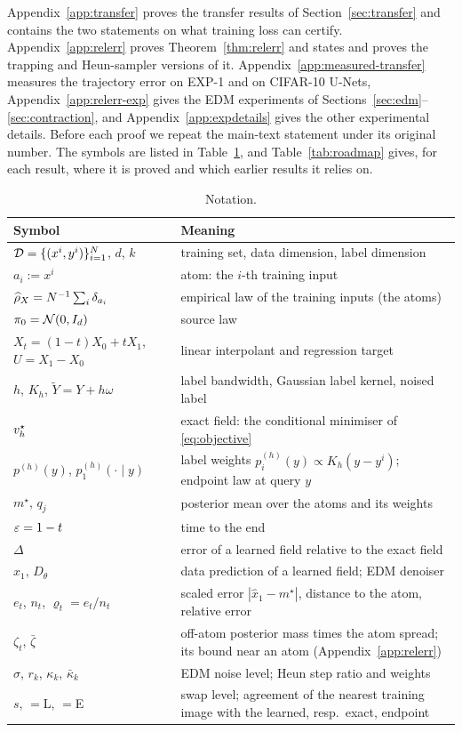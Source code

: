\documentclass{article} %
\theoremstyle{plain}
\theoremstyle{definition}
\theoremstyle{remark}
\begin{document}
Appendix~\ref{app:transfer} proves the transfer results of Section~\ref{sec:transfer} and contains
the two statements on what training loss can certify. Appendix~\ref{app:relerr} proves
Theorem~\ref{thm:relerr} and states and proves the trapping and Heun-sampler versions of it.
Appendix~\ref{app:measured-transfer} measures the trajectory error on EXP-1 and on CIFAR-10
U-Nets, Appendix~\ref{app:relerr-exp} gives the EDM experiments of
Sections~\ref{sec:edm}--\ref{sec:contraction}, and Appendix~\ref{app:expdetails} gives the other
experimental details. Before each proof we repeat the main-text statement under its original
number. The symbols are listed in Table~\ref{tab:notation}, and Table~\ref{tab:roadmap} gives, for each
result, where it is proved and which earlier results it relies on.

\begin{table}[h]
\centering\small
\begin{tabular}{@{}p{}p{}@{}}
\toprule
Symbol & Meaning\\
\midrule
$\mathcal{D}=\{(x^i,y^i)\}_{i=1}^N$, $d$, $k$ & training set, data dimension, label dimension\\
$a_i:=x^i$ & atom: the $i$-th training input\\
$\widehat{\rho}_X=N^{-1}\sum_i\delta_{a_i}$ & empirical law of the training inputs (the atoms)\\
$\pi_0=\mathcal{N}(0,I_d)$ & source law\\
$X_t=(1-t)X_0+tX_1$, $U=X_1-X_0$ & linear interpolant and regression target\\
$h$, $K_h$, $\widetilde Y=Y+h\omega$ & label bandwidth, Gaussian label kernel, noised label\\
$v_h^\star$ & exact field: the conditional minimiser of \eqref{eq:objective}\\
$p^{(h)}(y)$, $p_1^{(h)}(\cdot\mid y)$ & label weights $p_i^{(h)}(y)\propto K_h(y-y^i)$; endpoint law at query $y$\\
$m^\star$, $q_j$ & posterior mean over the atoms and its weights\\
$\varepsilon=1-t$ & time to the end\\
$\Delta$ & error of a learned field relative to the exact field\\
$\hat x_1$, $D_\theta$ & data prediction of a learned field; EDM denoiser\\
$e_t$, $n_t$, $\varrho_t=e_t/n_t$ & scaled error $|\hat x_1-m^\star|$, distance to the atom, relative error\\
$\zeta_t$, $\bar\zeta$ & off-atom posterior mass times the atom spread; its bound near an atom (Appendix~\ref{app:relerr})\\
$\sigma$, $r_k$, $\kappa_k$, $\bar\kappa_k$ & EDM noise level; Heun step ratio and weights\\
$s$, $=$L, $=$E & swap level; agreement of the nearest training image with the learned, resp.\ exact, endpoint\\
\bottomrule
\end{tabular}
\caption{Notation.}
\label{tab:notation}
\end{table}
\end{document}
